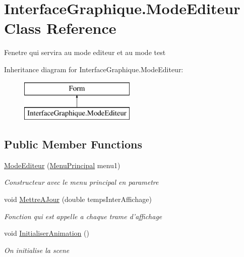 \hypertarget{class_interface_graphique_1_1_mode_editeur}{\section{Interface\-Graphique.\-Mode\-Editeur Class Reference}
\label{class_interface_graphique_1_1_mode_editeur}
}


Fenetre qui servira au mode editeur et au mode test  


Inheritance diagram for Interface\-Graphique.\-Mode\-Editeur\-:\begin{figure}[H]
\begin{center}
\leavevmode
\includegraphics[height=2.000000cm]{class_interface_graphique_1_1_mode_editeur}
\end{center}
\end{figure}
\subsection*{Public Member Functions}
\begin{DoxyCompactItemize}
\item 
\hyperlink{class_interface_graphique_1_1_mode_editeur_a3c6b0416ae28b26ce82b359b01a48e3e}{Mode\-Editeur} (\hyperlink{class_interface_graphique_1_1_menu_principal}{Menu\-Principal} menu1)
\begin{DoxyCompactList}\small\item\em Constructeur avec le menu principal en parametre \end{DoxyCompactList}\item 
void \hyperlink{class_interface_graphique_1_1_mode_editeur_a8677bf8911e2167ff725dc4c2f41c3fe}{Mettre\-A\-Jour} (double temps\-Inter\-Affichage)
\begin{DoxyCompactList}\small\item\em Fonction qui est appelle a chaque trame d'affichage \end{DoxyCompactList}\item 
void \hyperlink{class_interface_graphique_1_1_mode_editeur_aad47fe9fdfe51a25597e1bfa659128a3}{Initialiser\-Animation} ()
\begin{DoxyCompactList}\small\item\em On initialise la scene \end{DoxyCompactList}\end{DoxyCompactItemize}
